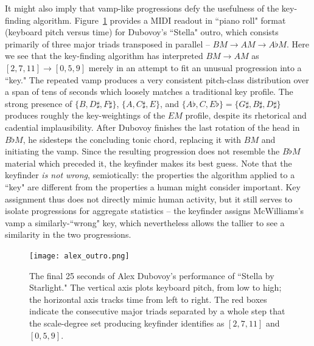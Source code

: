 \begin{enumerate}
It might also imply that vamp-like progressions defy the usefulness of the key-finding algorithm.  Figure~\ref{alex_outro} provides a MIDI readout in ``piano roll" format (keyboard pitch versus time) for Dubovoy's ``Stella" outro, which consists primarily of three major triads transposed in parallel -- $BM \rightarrow AM \rightarrow A\flat M$.  Here we see that the key-finding algorithm has interpreted $BM \rightarrow AM$ as $[2,7,11] \rightarrow [0,5,9]$ merely in an attempt to fit an unusual progression into a ``key."  The repeated vamp produces a very consistent pitch-class distribution over a span of tens of seconds which loosely matches a traditional key profile.  The strong presence of $\{B,D\sharp,F\sharp\}$, $\{A,C\sharp,E\}$, and $\{A\flat,C,E\flat\}=\{G\sharp,B\sharp,D\sharp\}$ produces roughly the key-weightings of the $EM$ profile, despite its rhetorical and cadential implausibility.  After Dubovoy finishes the last rotation of the head in $B\flat M$, he sidesteps the concluding tonic chord, replacing it with $BM$ and initiating the vamp.  Since the resulting progression does not resemble the $B\flat M$ material which preceded it, the keyfinder makes its best guess.  Note that the keyfinder \emph{is not wrong}, semiotically: the properties the algorithm applied to a ``key" are different from the properties a human might consider important.  Key assignment thus does not directly mimic human activity, but it still serves to isolate progressions for aggregate statistics -- the keyfinder assigns McWilliams's vamp a similarly-``wrong" key, which nevertheless allows the tallier to see a similarity in the two progressions.
	\begin{landscape}
	\begin{figure}
		\centering
		\caption{The final 25 seconds of Alex Dubovoy's performance of ``Stella by Starlight."  The vertical axis plots keyboard pitch, from low to high; the horizontal axis tracks time from left to right.  The red boxes indicate the consecutive major triads separated by a whole step that the scale-degree set producing keyfinder identifies as $[2,7,11]$ and $[0,5,9]$.}
		\label{alex_outro}
		\texttt{[image: alex\_outro.png]}
	\end{figure}
	\end{landscape}


\end{enumerate}
